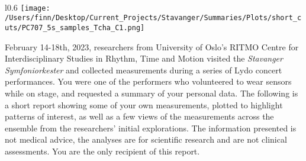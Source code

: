 \ %
\vspace{0.5cm}

\begin{center}
\begin{minipage}[h]{0.90\linewidth}
	\begin{wrapfigure}{l}{0.6\textwidth}
		\texttt{[image: /Users/finn/Desktop/Current\_Projects/Stavanger/Summaries/Plots/short\_cuts/PC707\_5s\_samples\_Tcha\_C1.png]}
		\\	%
	\end{wrapfigure}
	
	 February 14-18th, 2023, researchers from University of Oslo's RITMO Centre for Interdisciplinary Studies in Rhythm, Time and Motion visited the \textit{Stavanger Symfoniorkester} and collected measurements during a series of Lydo concert performances. You were one of the performers who volunteered to wear sensors while on stage, and requested a summary of your personal data. The following is a short report showing some of your own measurements, plotted to highlight patterns of interest, as well as a few views of the measurements across the ensemble from the researchers' initial explorations. The information presented is not medical advice, the analyses are for scientific research and are not clinical assessments. You are the only recipient of this report. 
\end{minipage}
\end{center}
\ %
\vspace{1cm}
	\SepRule

